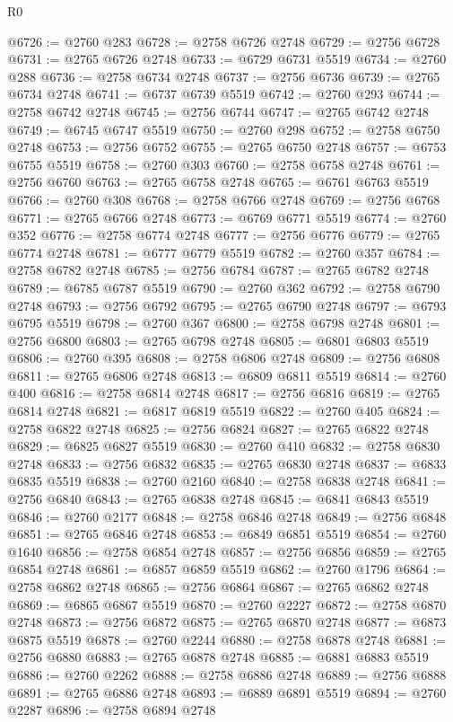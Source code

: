 \begin{lexlean}{R0}
\begin{coremodule}
@6726 := @2760 @283
@6728 := @2758 @6726 @2748
@6729 := @2756 @6728
@6731 := @2765 @6726 @2748
@6733 := @6729 @6731 @5519
@6734 := @2760 @288
@6736 := @2758 @6734 @2748
@6737 := @2756 @6736
@6739 := @2765 @6734 @2748
@6741 := @6737 @6739 @5519
@6742 := @2760 @293
@6744 := @2758 @6742 @2748
@6745 := @2756 @6744
@6747 := @2765 @6742 @2748
@6749 := @6745 @6747 @5519
@6750 := @2760 @298
@6752 := @2758 @6750 @2748
@6753 := @2756 @6752
@6755 := @2765 @6750 @2748
@6757 := @6753 @6755 @5519
@6758 := @2760 @303
@6760 := @2758 @6758 @2748
@6761 := @2756 @6760
@6763 := @2765 @6758 @2748
@6765 := @6761 @6763 @5519
@6766 := @2760 @308
@6768 := @2758 @6766 @2748
@6769 := @2756 @6768
@6771 := @2765 @6766 @2748
@6773 := @6769 @6771 @5519
@6774 := @2760 @352
@6776 := @2758 @6774 @2748
@6777 := @2756 @6776
@6779 := @2765 @6774 @2748
@6781 := @6777 @6779 @5519
@6782 := @2760 @357
@6784 := @2758 @6782 @2748
@6785 := @2756 @6784
@6787 := @2765 @6782 @2748
@6789 := @6785 @6787 @5519
@6790 := @2760 @362
@6792 := @2758 @6790 @2748
@6793 := @2756 @6792
@6795 := @2765 @6790 @2748
@6797 := @6793 @6795 @5519
@6798 := @2760 @367
@6800 := @2758 @6798 @2748
@6801 := @2756 @6800
@6803 := @2765 @6798 @2748
@6805 := @6801 @6803 @5519
@6806 := @2760 @395
@6808 := @2758 @6806 @2748
@6809 := @2756 @6808
@6811 := @2765 @6806 @2748
@6813 := @6809 @6811 @5519
@6814 := @2760 @400
@6816 := @2758 @6814 @2748
@6817 := @2756 @6816
@6819 := @2765 @6814 @2748
@6821 := @6817 @6819 @5519
@6822 := @2760 @405
@6824 := @2758 @6822 @2748
@6825 := @2756 @6824
@6827 := @2765 @6822 @2748
@6829 := @6825 @6827 @5519
@6830 := @2760 @410
@6832 := @2758 @6830 @2748
@6833 := @2756 @6832
@6835 := @2765 @6830 @2748
@6837 := @6833 @6835 @5519
@6838 := @2760 @2160
@6840 := @2758 @6838 @2748
@6841 := @2756 @6840
@6843 := @2765 @6838 @2748
@6845 := @6841 @6843 @5519
@6846 := @2760 @2177
@6848 := @2758 @6846 @2748
@6849 := @2756 @6848
@6851 := @2765 @6846 @2748
@6853 := @6849 @6851 @5519
@6854 := @2760 @1640
@6856 := @2758 @6854 @2748
@6857 := @2756 @6856
@6859 := @2765 @6854 @2748
@6861 := @6857 @6859 @5519
@6862 := @2760 @1796
@6864 := @2758 @6862 @2748
@6865 := @2756 @6864
@6867 := @2765 @6862 @2748
@6869 := @6865 @6867 @5519
@6870 := @2760 @2227
@6872 := @2758 @6870 @2748
@6873 := @2756 @6872
@6875 := @2765 @6870 @2748
@6877 := @6873 @6875 @5519
@6878 := @2760 @2244
@6880 := @2758 @6878 @2748
@6881 := @2756 @6880
@6883 := @2765 @6878 @2748
@6885 := @6881 @6883 @5519
@6886 := @2760 @2262
@6888 := @2758 @6886 @2748
@6889 := @2756 @6888
@6891 := @2765 @6886 @2748
@6893 := @6889 @6891 @5519
@6894 := @2760 @2287
@6896 := @2758 @6894 @2748

\end{coremodule}
\end{lexlean}
